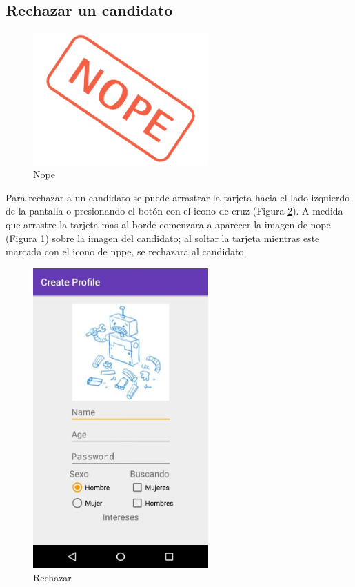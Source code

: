 \documentclass[10pt,letterpaper,extrafontsizes]{memoir}
\begin{document}
\subsection{Rechazar un candidato}

\begin{figure}[H]
    \centering
\includegraphics[width=0.6\textwidth]{graficos/imagenes/nope}
    \caption{Nope}
    \label{fig:nope}
\end{figure}

Para rechazar a un candidato se puede arrastrar la tarjeta hacia el lado izquierdo de la pantalla o presionando el botón con el icono de cruz (Figura \ref{fig:dnope}). A medida que arrastre la tarjeta mas al borde comenzara a aparecer la imagen de nope (Figura \ref{fig:nope}) sobre la imagen del candidato; al soltar la tarjeta mientras este marcada con el icono de nppe, se rechazara al candidato.

\begin{figure}[H]
    \centering
\includegraphics[width=0.6\textwidth]{graficos/capturas/i}
    \caption{Rechazar}
    \label{fig:dnope}
\end{figure}
\end{document}
